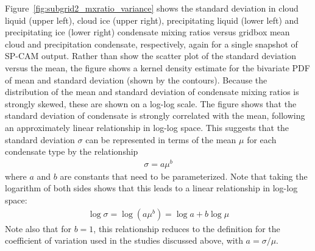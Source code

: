 Figure~\ref{fig:subgrid2_mxratio_variance} shows the standard deviation
in cloud liquid (upper left), cloud ice (upper right), precipitating
liquid (lower left) and precipitating ice (lower right) condensate
mixing ratios versus gridbox mean cloud and precipitation condensate,
respectively, again for a single snapshot of SP-CAM output. Rather than
show the scatter plot of the standard deviation versus the mean, the
figure shows a kernel density estimate for the bivariate PDF of mean and
standard deviation (shown by the contours). Because the distribution of
the mean and standard deviation of condensate mixing ratios is strongly
skewed, these are shown on a log-log scale. The figure shows that the
standard deviation of condensate is strongly correlated with the mean,
following an approximately linear relationship in log-log space. This
suggests that the standard deviation \(\sigma\) can be represented in
terms of the mean \(\mu\) for each condensate type by the relationship
\begin{equation}\begin{gathered}
    \sigma = a \mu^b
\end{gathered}\label{eq:sigmaMu}\end{equation} where \(a\) and \(b\) are
constants that need to be parameterized. Note that taking the logarithm
of both sides shows that this leads to a linear relationship in log-log
space: \[\begin{gathered} 
    \log \sigma = \log(a \mu^b) = \log a + b\log \mu
\end{gathered}\] Note also that for \(b = 1\), this relationship reduces
to the definition for the coefficient of variation used in the studies
discussed above, with \(a = \sigma / \mu\).

